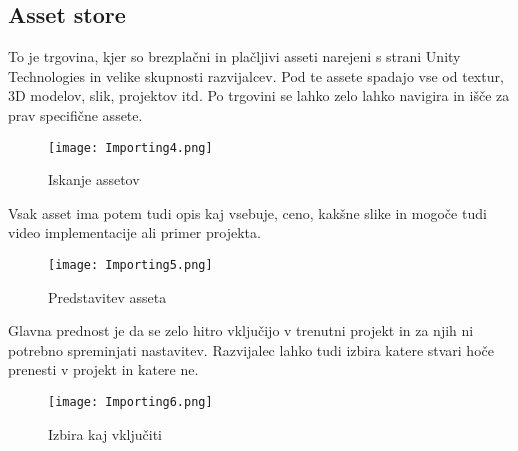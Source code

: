 {\color{indiagreen}\subsection{Asset store}}
To je trgovina, kjer so brezplačni in plačljivi asseti narejeni s strani Unity Technologies in velike skupnosti razvijalcev. Pod te assete spadajo vse od textur, 3D modelov, slik, projektov itd. Po trgovini se lahko zelo lahko navigira in išče za prav specifične assete.\\
\begin{figure}[ht!]
	\centering
	\texttt{[image: Importing4.png]}
	\caption{Iskanje assetov}
\end{figure}
Vsak asset ima potem tudi opis kaj vsebuje, ceno, kakšne slike in mogoče tudi video implementacije ali primer projekta.\\
\begin{figure}[ht!]
	\centering
	\texttt{[image: Importing5.png]}
	\caption{Predstavitev asseta}
\end{figure}
Glavna prednost je da se zelo hitro vključijo v trenutni projekt in za njih ni potrebno spreminjati nastavitev. Razvijalec lahko tudi izbira katere stvari hoče prenesti v projekt in katere ne.\\
\begin{figure}[ht!]
	\centering
	\texttt{[image: Importing6.png]}
	\caption{Izbira kaj vključiti}
\end{figure}